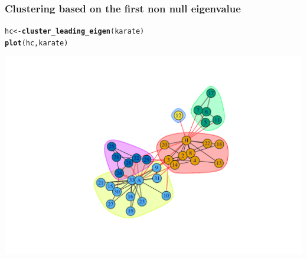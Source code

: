 \documentclass{beamer}\usepackage[]{graphicx}\usepackage[]{color}
\makeatletter
\newcommand{\hlstd}[1]{\textcolor[rgb]{0.345,0.345,0.345}{#1}}%
\newcommand{\hlkwb}[1]{\textcolor[rgb]{0.69,0.353,0.396}{#1}}%
\newcommand{\hlkwd}[1]{\textcolor[rgb]{0.737,0.353,0.396}{\textbf{#1}}}%
\newenvironment{kframe}{%
 \def\at@end@of@kframe{}%
 \ifinner\ifhmode%
  \def\at@end@of@kframe{\end{minipage}}%
  \begin{minipage}{\columnwidth}%
 \fi\fi%
 \def\FrameCommand##1{\hskip\@totalleftmargin \hskip-\fboxsep
 \colorbox{shadecolor}{##1}\hskip-\fboxsep
     \hskip-\linewidth \hskip-\@totalleftmargin \hskip\columnwidth}%
 \MakeFramed {\advance\hsize-\width
   \@totalleftmargin\z@ \linewidth\hsize
   \@setminipage}}%
 {\par\unskip\endMakeFramed%
 \at@end@of@kframe}
\newenvironment{knitrout}{}{} %
\makeatother
\begin{document}
\begin{frame}[fragile]
  \frametitle{Clustering based on the first non null eigenvalue}
  
\begin{knitrout}\scriptsize
{}\color{fgcolor}\begin{kframe}
\begin{alltt}
\hlstd{hc} \hlkwb{<-} \hlkwd{cluster_leading_eigen}\hlstd{(karate)}
\hlkwd{plot}\hlstd{(hc,karate)}
\end{alltt}
\end{kframe}
\includegraphics[width=.8\textwidth]{figures/unnamed-chunk-5-1} 

\end{knitrout}

\end{frame}
\end{document}
